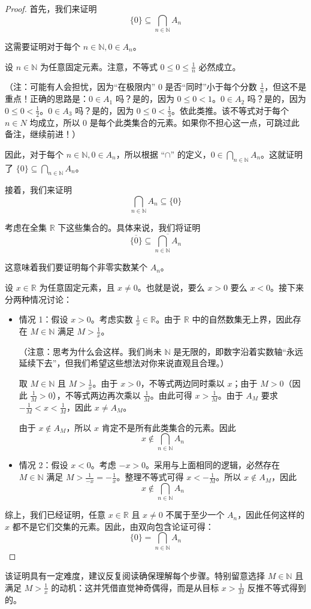 \begin{proof}
    首先，我们来证明
    \[\{0\} \subseteq \bigcap_{n \in \mathbb{N}}A_n\]

    这需要证明对于每个 $n \in \mathbb{N}, 0 \in A_n$。

    设 $n \in \mathbb{N}$ 为任意固定元素。注意，不等式 $0 \le 0 \le \frac{1}{n}$ 必然成立。

    （注：可能有人会担忧，因为``在极限内'' $0$ 是否``同时''小于每个分数 $\frac{1}{n}$，但这不是重点！正确的思路是：$0 \in A_1$ 吗？是的，因为 $0 \le 0 < 1$。$0 \in A_2$ 吗？是的，因为 $0 \le 0 < \frac{1}{2}$。$0 \in A_3$ 吗？是的，因为 $0 \le 0 < \frac{1}{3}$。依此类推。该不等式对于每个 $n \in N$ 均成立，所以 $0$ 是每个此类集合的元素。如果你不担心这一点，可跳过此备注，继续前进！）

    因此，对于每个 $n \in \mathbb{N}, 0 \in A_n$，所以根据 ``$\cap$'' 的定义，$\displaystyle{0 \in \bigcap_{n \in \mathbb{N}} A_n}$。这就证明了 $\displaystyle{\{0\} \subseteq \bigcap_{n \in \mathbb{N}} A_n}$。

    接着，我们来证明
    \[\bigcap_{n \in \mathbb{N}}A_n \subseteq \{0\}\]

    考虑在全集 $\mathbb{R}$ 下这些集合的。具体来说，我们将证明
    \[\overline{\{0\}} \subseteq \overline{\bigcap_{n \in \mathbb{N}}A_n}\]

    这意味着我们要证明每个非零实数某个 $A_n$。

    设 $x \in \mathbb{R}$ 为任意固定元素，且 $x \ne 0$。也就是说，要么 $x > 0$ 要么 $x < 0$。接下来分两种情况讨论：

    \begin{itemize}
        \item 情况 1：假设 $x > 0$。考虑实数 $\frac{1}{x} \in \mathbb{R}$。由于 $\mathbb{R}$ 中的自然数集无上界，因此存在 $M \in \mathbb{N}$ 满足 $M > \frac{1}{x}$。
        
        （注意：思考为什么会这样。我们尚未 $\mathbb{N}$ 是无限的，即数字沿着实数轴``永远延续下去''，但我们希望这些想法对你来说直观且合理。）

        取 $M \in \mathbb{N}$ 且 $M > \frac{1}{x}$。由于 $x > 0$，不等式两边同时乘以 $x$；由于 $M > 0$（因此 $\frac{1}{M} > 0$），不等式两边再次乘以 $\frac{1}{M}$。由此可得 $x > \frac{1}{M}$。由于 $A_M$ 要求 $-\frac{1}{M} < x < \frac{1}{M}$，因此 $x \ne A_M$。

        由于 $x \notin A_M$，所以 $x$ 肯定不是所有此类集合的元素。因此
        \[x \notin \bigcap_{n \in \mathbb{N}} A_n\]

        \item 情况 2：假设 $x < 0$。考虑 $-x > 0$。采用与上面相同的逻辑，必然存在 $M \in \mathbb{N}$ 满足 $M > \frac{1}{-x} = -\frac{1}{x}$。整理不等式可得 $x < -\frac{1}{M}$。所以 $x \notin A_M$，因此 
        \[x \notin \bigcap_{n \in \mathbb{N}} A_n\]
    \end{itemize}

    综上，我们已经证明，任意 $x \in \mathbb{R}$ 且 $x \ne 0$ 不属于至少一个 $A_n$，因此任何这样的 $x$ 都不是它们交集的元素。因此，由双向包含论证可得：
    \[\{0\} = \bigcap_{n \in \mathbb{N}} A_n\]
\end{proof}

该证明具有一定难度，建议反复阅读确保理解每个步骤。特别留意选择 $M \in \mathbb{N}$ 且满足 $M > \frac{1}{x}$ 的动机：这并凭借直觉神奇偶得，而是从目标 $x > \frac{1}{M}$ 反推不等式得到的。
